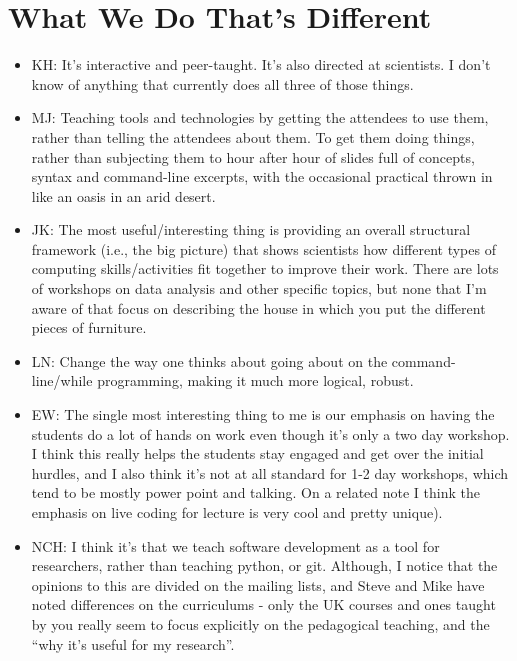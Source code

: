 \documentclass{article}
\begin{document}
\section{What We Do That's Different}

\begin{itemize}

  \item KH: It's interactive and peer-taught. It's also directed at
    scientists. I don't know of anything that currently does all three
    of those things.

  \item MJ: Teaching tools and technologies by getting the attendees
    to use them, rather than telling the attendees about them. To get
    them doing things, rather than subjecting them to hour after hour
    of slides full of concepts, syntax and command-line excerpts, with
    the occasional practical thrown in like an oasis in an arid
    desert.

  \item JK: The most useful/interesting thing is providing an overall
    structural framework (i.e., the big picture) that shows scientists
    how different types of computing skills/activities fit together to
    improve their work. There are lots of workshops on data analysis
    and other specific topics, but none that I'm aware of that focus
    on describing the house in which you put the different pieces of
    furniture.

  \item LN: Change the way one thinks about going about on the
    command-line/while programming, making it much more logical,
    robust.

  \item EW: The single most interesting thing to me is our emphasis on
    having the students do a lot of hands on work even though it's
    only a two day workshop. I think this really helps the students
    stay engaged and get over the initial hurdles, and I also think
    it's not at all standard for 1-2 day workshops, which tend to be
    mostly power point and talking. On a related note I think the
    emphasis on live coding for lecture is very cool and pretty
    unique).

  \item NCH: I think it's that we teach software development as a tool
    for researchers, rather than teaching python, or git. Although, I
    notice that the opinions to this are divided on the mailing lists,
    and Steve and Mike have noted differences on the curriculums -
    only the UK courses and ones taught by you really seem to focus
    explicitly on the pedagogical teaching, and the ``why it's useful
    for my research''.


\end{itemize}
\end{document}

